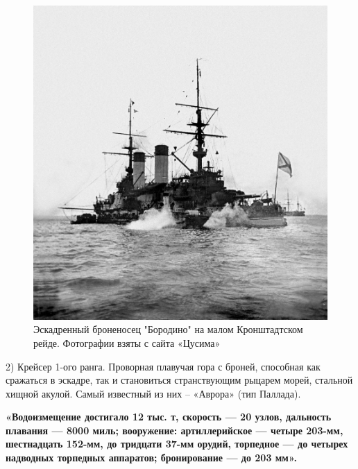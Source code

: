 \begin{figure}[h!tb] 
	\centering\includegraphics[scale=0.2]{Data/RYAV_sily_storon/pDAKm_tQdIg.jpg}
	\caption{Эскадренный броненосец "Бородино" на малом Кронштадтском рейде. Фотографии взяты с сайта «Цусима»
	}%
\end{figure}


2) Крейсер 1-ого ранга. Проворная плавучая гора с броней, способная как сражаться в эскадре, так и становиться странствующим рыцарем морей, стальной хищной акулой. Самый известный из них – «Аврора» (тип Паллада).

\textbf{«Водоизмещение достигало 12 тыс. т, скорость — 20 узлов, дальность плавания — 8000 миль; вооружение: артиллерийское — четыре 203-мм, шестнадцать 152-мм, до тридцати 37-мм орудий, торпедное — до четырех надводных торпедных аппаратов; бронирование — до 203 мм».}


